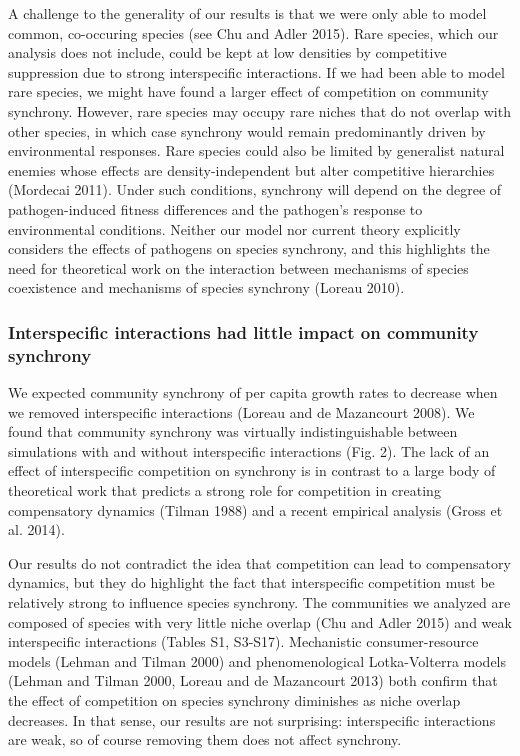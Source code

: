 \documentclass[12pt,]{article}
\begin{document}
A challenge to the generality of our results is that we were only able
to model common, co-occuring species (see Chu and Adler 2015). Rare
species, which our analysis does not include, could be kept at low
densities by competitive suppression due to strong interspecific
interactions. If we had been able to model rare species, we might have
found a larger effect of competition on community synchrony. However,
rare species may occupy rare niches that do not overlap with other
species, in which case synchrony would remain predominantly driven by
environmental responses. Rare species could also be limited by
generalist natural enemies whose effects are density-independent but
alter competitive hierarchies (Mordecai 2011). Under such conditions,
synchrony will depend on the degree of pathogen-induced fitness
differences and the pathogen's response to environmental conditions.
Neither our model nor current theory explicitly considers the effects of
pathogens on species synchrony, and this highlights the need for
theoretical work on the interaction between mechanisms of species
coexistence and mechanisms of species synchrony (Loreau 2010).

\subsubsection{Interspecific interactions had little impact on community
synchrony}\label{interspecific-interactions-had-little-impact-on-community-synchrony}

We expected community synchrony of per capita growth rates to decrease
when we removed interspecific interactions (Loreau and {{de Mazancourt}}
2008). We found that community synchrony was virtually indistinguishable
between simulations with and without interspecific interactions (Fig.
2). The lack of an effect of interspecific competition on synchrony is
in contrast to a large body of theoretical work that predicts a strong
role for competition in creating compensatory dynamics (Tilman 1988) and
a recent empirical analysis (Gross et al. 2014).

Our results do not contradict the idea that competition can lead to
compensatory dynamics, but they do highlight the fact that interspecific
competition must be relatively strong to influence species synchrony.
The communities we analyzed are composed of species with very little
niche overlap (Chu and Adler 2015) and weak interspecific interactions
(Tables S1, S3-S17). Mechanistic consumer-resource models (Lehman and
Tilman 2000) and phenomenological Lotka-Volterra models (Lehman and
Tilman 2000, Loreau and {{de Mazancourt}} 2013) both confirm that the
effect of competition on species synchrony diminishes as niche overlap
decreases. In that sense, our results are not surprising: interspecific
interactions are weak, so of course removing them does not affect
synchrony.
\end{document}

